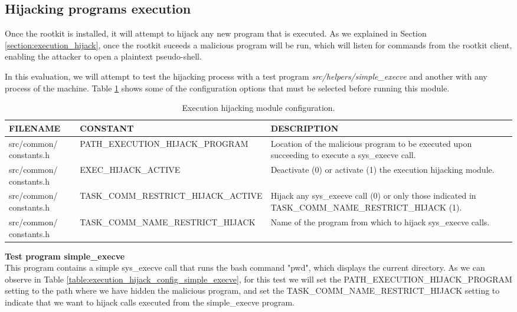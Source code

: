 \subsection{Hijacking programs execution}
Once the rootkit is installed, it will attempt to hijack any new program that is executed. As we explained in Section \ref{section:execution_hijack}, once the rootkit suceeds a malicious program will be run, which will listen for commands from the rootkit client, enabling the attacker to open a plaintext pseudo-shell.

In this evaluation, we will attempt to test the hijacking process with a test program \textit{src/helpers/simple\_execve} and another with any process of the machine. Table \ref{table:execution_hijack_config} shows some of the configuration options that must be selected before running this module.

\begin{table}[htbp]
\begin{tabular}{|>{\centering\arraybackslash}p{3cm}|>{\centering\arraybackslash}p{4.5cm}|>{\centering\arraybackslash}p{6cm}|}
\hline
\textbf{FILENAME} & \textbf{CONSTANT} & \textbf{DESCRIPTION}\\
\hline
\hline
src/common/ constants.h & PATH\_EXECUTION\_HIJACK\_PROGRAM & Location of the malicious program to be executed upon succeeding to execute a sys\_execve call.\\
\hline
src/common/ constants.h & EXEC\_HIJACK\_ACTIVE & Deactivate (0) or activate (1) the execution hijacking module.\\
\hline
src/common/ constants.h & TASK\_COMM\_RESTRICT\_HIJACK\_ACTIVE  & Hijack any sys\_execve call (0) or only those indicated in TASK\_COMM\_NAME\_RESTRICT\_HIJACK (1).\\
\hline
src/common/ constants.h & TASK\_COMM\_NAME\_RESTRICT\_HIJACK & Name of the program from which to hijack sys\_execve calls.\\
\hline
\end{tabular}
\caption{Execution hijacking module configuration.}
\label{table:execution_hijack_config}
\end{table}


\textbf{Test program simple\_execve}\\
This program contains a simple sys\_execve call that runs the bash command "pwd", which displays the current directory. As we can observe in Table \ref{table:execution_hijack_config_simple_execve}, for this test we will set the PATH\_EXECUTION\_HIJACK\_PROGRAM setting to the path where we have hidden the malicious program, and set the TASK\_COMM\_NAME\_RESTRICT\_HIJACK setting to indicate that we want to hijack calls executed from the simple\_execve program.

